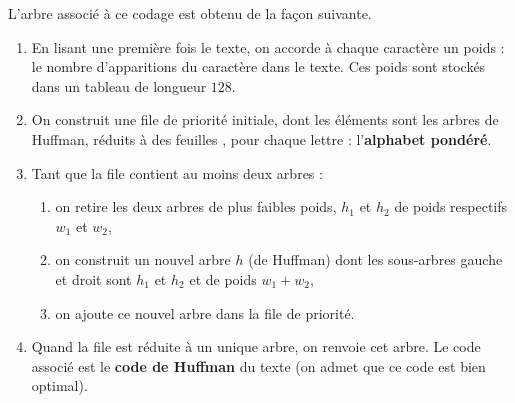 L'arbre associé à ce codage est obtenu de la façon suivante.
\begin{enumerate}
  \item En lisant une première fois le texte, on accorde à chaque caractère un poids : le nombre d'apparitions du caractère dans le texte. Ces poids sont stockés dans un tableau de longueur $128$.
  \item On construit une file de priorité initiale, dont les éléments sont les
arbres de Huffman, réduits à des feuilles , pour chaque lettre : l'{\bf alphabet pondéré}.
\item Tant que la file contient au moins deux arbres :
\begin{enumerate}
  \item on retire les deux arbres de plus faibles poids, $h_1$ et $h_2$ de poids respectifs $w_1$ et $w_2$,
  \item on construit un nouvel arbre $h$ (de Huffman) dont les sous-arbres gauche et droit sont $h_1$ et $h_2$ et de poids $w_1+w_2$,
  \item on ajoute ce nouvel arbre dans la file de priorité.
\end{enumerate}
\item Quand la file est réduite à un unique arbre, on renvoie cet arbre. Le code associé est le {\bf code de Huffman} du texte (on admet que ce code est bien optimal).
\end{enumerate}

